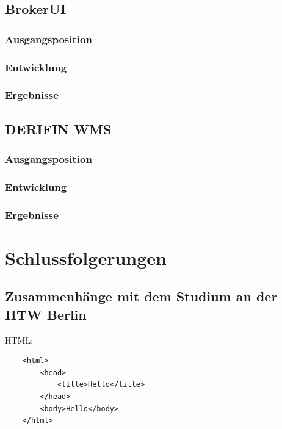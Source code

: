 \documentclass[chapterprefix=false, 12pt, a4paper, oneside, parskip=half, listof=totoc, bibliography=totoc, numbers=noendperiod]{scrbook}
\begin{document}
    \section{BrokerUI}

    \subsection{Ausgangsposition}

    \subsection{Entwicklung}

    \subsection{Ergebnisse}

    \section{DERIFIN WMS}

    \subsection{Ausgangsposition}

    \subsection{Entwicklung}

    \subsection{Ergebnisse}

    \chapter{Schlussfolgerungen}

    \section{Zusammenhänge mit dem Studium an der HTW Berlin}

    HTML:

    \begin{verbatim}
    <html>
        <head>
            <title>Hello</title>
        </head>
        <body>Hello</body>
    </html>
    \end{verbatim}
\end{document}
